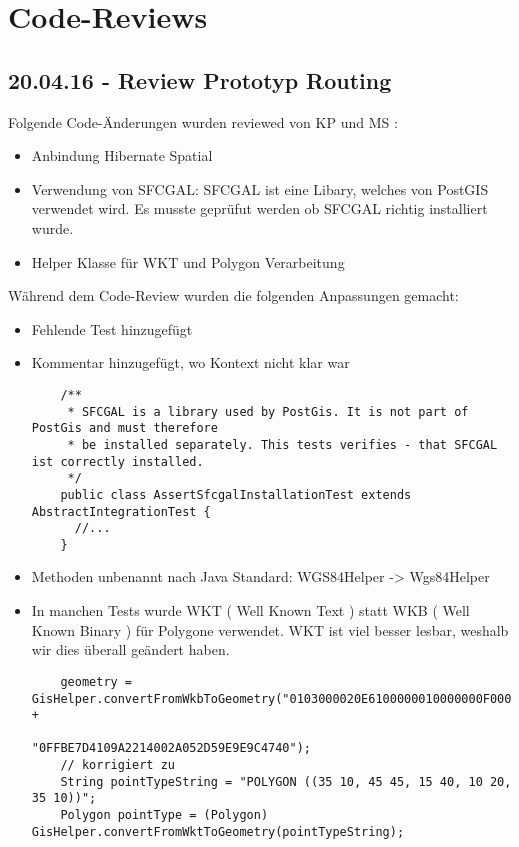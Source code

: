 \newpage
\chapter{Code-Reviews} 

\section{20.04.16 - Review Prototyp Routing}
Folgende Code-Änderungen wurden reviewed von KP und MS :
\begin{itemize}
	\item{Anbindung Hibernate Spatial}
	\item{Verwendung von SFCGAL: SFCGAL ist eine Libary, welches von PostGIS verwendet wird. Es musste geprüfut werden ob SFCGAL richtig installiert wurde.}
	\item{Helper Klasse für WKT und Polygon Verarbeitung}
\end{itemize}

Während dem Code-Review wurden die folgenden Anpassungen gemacht:
\begin{itemize}
	\item{Fehlende Test hinzugefügt}
	\item{Kommentar hinzugefügt, wo Kontext nicht klar war}
	\begin{lstlisting}
	/**
     * SFCGAL is a library used by PostGis. It is not part of PostGis and must therefore
     * be installed separately. This tests verifies - that SFCGAL ist correctly installed.
     */
    public class AssertSfcgalInstallationTest extends AbstractIntegrationTest {
      //...
    }
	\end{lstlisting}
	\item{Methoden unbenannt nach Java Standard: WGS84Helper -> Wgs84Helper }
	\item{In manchen Tests wurde WKT ( Well Known Text ) statt WKB ( Well Known Binary ) für Polygone verwendet. WKT ist viel besser lesbar, weshalb wir dies überall geändert haben.}
	\begin{lstlisting}
    geometry = GisHelper.convertFromWkbToGeometry("0103000020E6100000010000000F00000" +
                                                  "0FFBE7D4109A2214002A052D59E9E9C4740");
    // korrigiert zu
    String pointTypeString = "POLYGON ((35 10, 45 45, 15 40, 10 20, 35 10))";
    Polygon pointType = (Polygon) GisHelper.convertFromWktToGeometry(pointTypeString);
	\end{lstlisting}
\end{itemize}
\newpage

